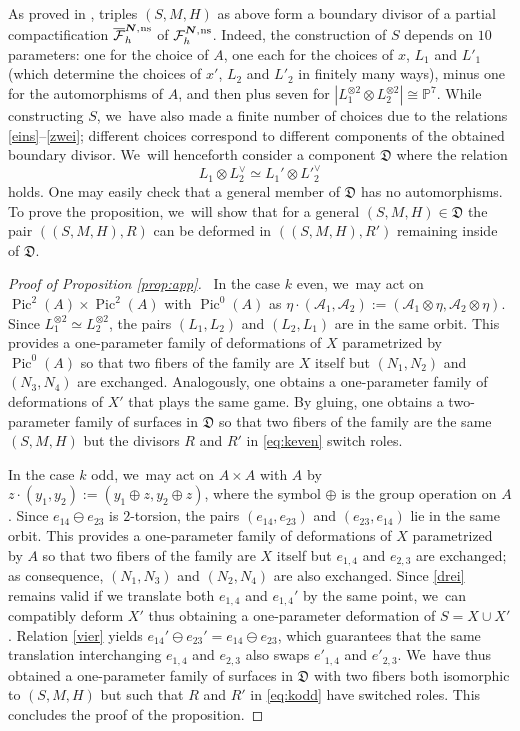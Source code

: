 \documentclass[11pt]{article}
\newcommand{\ns}{{\mkern1mu\mathrm{ns}}}
\newcommand{\bN}{\boldsymbol{N}}
\theoremstyle{plain}
\theoremstyle{definition}
\DeclareMathOperator{\Pic}{Pic}
\newcommand\PP{{\mathbb P}}
\newcommand\A{{\mathcal A}}
\newcommand\F{{\mathcal F}}
\begin{document}
As proved in \cite[Cor.\,5.9 \& Prop.\,5.4]{KLV1},
triples $(S,M,H)$ as above form a boundary divisor of a partial compactification $\overline{\F}_h^{\bN,\ns}$ of $\F_h^{\bN,\ns}$. Indeed, the construction of $S$
depends on $10$ parameters: one for the choice of $A$, one each for the choices of $x$, $L_1$ and $L'_1$ (which determine the choices of $x'$, $L_2$ and $L'_2$ in finitely many ways), minus one for the automorphisms of $A$, and then plus seven for $|L_1^{\otimes2}\otimes L_2^{\otimes 2}| \cong \PP^7$. While constructing $S$, we~have also made a finite number of choices due to the relations \eqref{eins}--\eqref{zwei}; different choices correspond to different components of the obtained boundary divisor. We~will henceforth consider a component $\mathfrak D$ where the relation
\begin{equation}\label{vier}
L_1\otimes L_2^\vee\simeq L_1'\otimes {L'}_2^\vee
\end{equation}
holds. One may easily check that a general member of $\mathfrak D$ has no automorphisms. To prove the proposition, we~will show that for a general $(S,M,H) \in \mathfrak D$ the pair $((S,M,H),R)$ can be deformed in $((S,M,H),R')$ remaining inside of $\mathfrak D$.

\begin{proof}[Proof of Proposition \ref{prop:app}]\
In the case $k$ even, we~may act on $\Pic^2(A)\times \Pic^2(A)$ with $\Pic^0(A)$ as $\eta\cdot (\A_1,\A_2):=(\A_1\otimes \eta, \A_2\otimes \eta)$. Since $L_1^{\otimes 2}\simeq L_2^{\otimes 2}$, the pairs $(L_1,L_2)$ and $(L_2,L_1)$ are in the same orbit. This provides a one-parameter family of deformations of $X$ parametrized by $\Pic^0(A)$ so that two fibers of the family are $X$ itself but $(N_1,N_2)$ and $(N_3,N_4)$ are exchanged. Analogously, one obtains a one-parameter family of deformations of $X'$ that plays the same game. By gluing, one obtains a two-parameter family of surfaces in $\mathfrak D$ so that two fibers of the family are the same $(S,M,H)$ but the divisors $R$ and $R'$ in \eqref{eq:keven} switch roles.

In the case $k$ odd, we~may act on $A\times A$ with $A$ by $z\cdot (y_1,y_2):=(y_1\oplus z,y_2\oplus z)$, where the symbol $\oplus$ is the group operation on $A$. Since $e_{14}\ominus e_{23}$ is $2$-torsion, the pairs $(e_{14}, e_{23})$ and $(e_{23},e_{14})$ lie in the same orbit. This provides a one-parameter family of deformations of $X$ parametrized by $A$ so that two fibers of the family are $X$ itself but $e_{1,4}$ and $e_{2,3}$ are exchanged; as consequence, $(N_1,N_3)$ and $(N_2,N_4)$ are also exchanged. Since \eqref{drei} remains valid if we translate both $e_{1,4}$ and $e_{1,4}'$ by the same point, we~can compatibly deform $X'$ thus obtaining a one-parameter deformation of $S=X\cup X'$. Relation \eqref{vier} yields $e_{14}'\ominus e_{23}'=e_{14}\ominus e_{23}$, which guarantees that the same translation interchanging $e_{1,4}$ and $e_{2,3}$ also swaps $e'_{1,4}$ and $e'_{2,3}$. We~have thus obtained a one-parameter family of surfaces in $\mathfrak D$ with two fibers both isomorphic to $(S,M,H)$ but such that $R$ and $R'$ in \eqref{eq:kodd} have switched roles. This concludes the proof of the proposition.
\end{proof}
\end{document}
